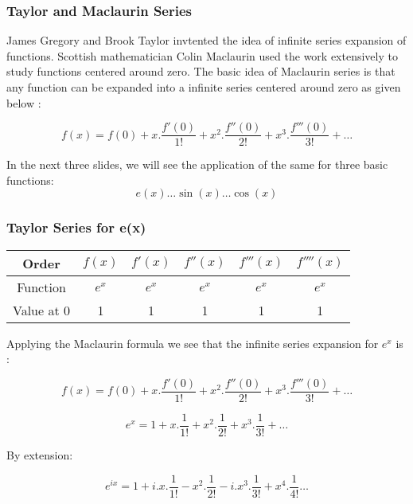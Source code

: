 \documentclass[10pt]{beamer}
\begin{document}
\begin{frame}
	\frametitle{Taylor and Maclaurin Series}
	James Gregory and Brook Taylor invtented the idea of infinite series expansion of functions.  Scottish mathematician Colin Maclaurin used the work extensively to study functions centered around zero.  The basic idea of Maclaurin series is that any function can be expanded into a infinite series centered around zero as given below :
	\vspace{20pt}

	\large $$f(x) = f(0)+x.\dfrac{f'(0)}{1!}+ x^2.\dfrac{f''(0)}{2!} +x^3.\dfrac{f'''(0)}{3!} + \dots$$

	\vspace{20pt}

	In the next three slides, we will see the application of the same for three basic functions: $$e(x) \dots \sin(x) \dots \cos(x)$$
\end{frame}

\begin{frame}
	\frametitle{Taylor Series for e(x)}
	\begin{center}
		\begin{tabular}{|c|c|c|c|c|c|}
			\hline
			Order &$f(x)$ & $f'(x)$ & $f''(x)$ & $f'''(x)$ & $f''''(x)$ \\
			\hline
			Function & $e^x$  & $e^x$   & $e^x$    & $e^x$     & $e^x$      \\
			\hline
			Value at 0 & 1      & 1       & 1        & 1         & 1          \\
			\hline
		\end{tabular}
	\end{center}
	\vspace{20pt}
	Applying the Maclaurin formula we see that the infinite series expansion for $e^x$ is :

	\large $$f(x) = f(0)+x.\dfrac{f'(0)}{1!}+ x^2.\dfrac{f''(0)}{2!} +x^3.\dfrac{f'''(0)}{3!} + \dots$$

	\large $$e^x = 1+x.\dfrac{1}{1!}+ x^2.\dfrac{1}{2!} +x^3.\dfrac{1}{3!} + \dots$$

	By extension:

	\large $$e^{ix} = 1+i.x.\dfrac{1}{1!}- x^2.\dfrac{1}{2!} -i.x^3.\dfrac{1}{3!} + x^4.\dfrac{1}{4!} \dots$$


\end{frame}
\end{document}
